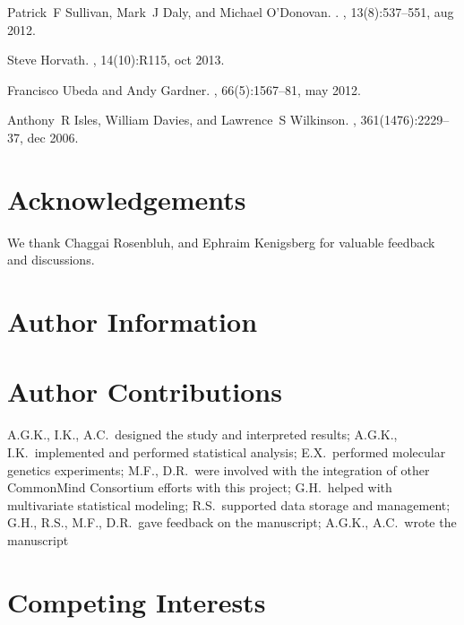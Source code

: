 \documentclass[letterpaper]{article}
\begin{document}
\begin{thebibliography}{10}
Patrick~F Sullivan, Mark~J Daly, and Michael O'Donovan.
.
, 13(8):537--551, aug 2012.

Steve Horvath.
, 14(10):R115, oct 2013.

Francisco Ubeda and Andy Gardner.
,
  66(5):1567--81, may 2012.

Anthony~R Isles, William Davies, and Lawrence~S Wilkinson.
, 361(1476):2229--37, dec 2006.

\end{thebibliography}

\section*{Acknowledgements}

We thank Chaggai Rosenbluh, and Ephraim Kenigsberg for valuable feedback and discussions.

\section*{Author Information}

\section*{Author Contributions}

A.G.K., I.K., A.C.~designed the study and interpreted results;  A.G.K.,
I.K.~implemented and performed statistical analysis; E.X.~performed molecular
genetics experiments; M.F., D.R.~were involved with the integration of other
CommonMind Consortium efforts with this project; G.H.~helped with multivariate
statistical modeling; R.S.~supported data storage and management; G.H., R.S.,
M.F., D.R.~gave feedback on the manuscript; A.G.K., A.C.~wrote the manuscript

\section*{Competing Interests}
\end{document}
